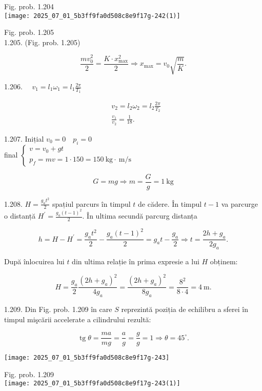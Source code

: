Fig. prob. 1.204\\
\texttt{[image: 2025\_07\_01\_5b3ff9fa0d508c8e9f17g-242(1)]}

Fig. prob. 1.205\\
1.205. (Fig. prob. 1.205)

$$
\frac{m v_{0}^{2}}{2}=\frac{K \cdot x_{\max }^{2}}{2} \Rightarrow x_{\max }=v_{0} \sqrt{\frac{m}{K}} .
$$

1.206. $\quad v_{1}=l_{1} \omega_{1}=l_{1} \frac{2 \pi}{T_{1}}$

$$
\begin{aligned}
& v_{2}=l_{2} \omega_{2}=l_{2} \frac{2 \pi}{T_{2}} \\
& \frac{v_{1}}{v_{2}}=\frac{1}{18} .
\end{aligned}
$$

1.207. Inițial $v_{0}=0 \quad p_{i}=0$\\
final $\left\{\begin{array}{l}v=v_{0}+g t \\ p_{f}=m v=1 \cdot 150=150 \mathrm{~kg} \cdot \mathrm{~m} / \mathrm{s}\end{array}\right.$

$$
G=m g \Rightarrow m=\frac{G}{g}=1 \mathrm{~kg}
$$

1.208. $H=\frac{g_{a} t^{2}}{2}$ spațiul parcurs în timpul $t$ de cădere. În timpul $t-1$ va parcurge o distanță $H^{\prime}=\frac{g_{a}(t-1)^{2}}{2}$. În ultima secundă parcurg distanța

$$
h=H-H^{\prime}=\frac{g_{a} t^{2}}{2}-\frac{g_{a}(t-1)^{2}}{2}=g_{a} t-\frac{g_{a}}{2} \Rightarrow t=\frac{2 h+g_{a}}{2 g_{a}} .
$$

După înlocuirea lui $t$ din ultima relație în prima expresie a lui $H$ obținem:

$$
H=\frac{g_{a}}{2} \frac{\left(2 h+g_{a}\right)^{2}}{4 g_{a}}=\frac{\left(2 h+g_{a}\right)^{2}}{8 g_{a}}=\frac{8^{2}}{8 \cdot 4}=4 \mathrm{~m} .
$$

1.209. Din Fig. prob. 1.209 în care $S$ reprezintă poziția de echilibru a sferei în timpul mişcării accelerate a cilindrului rezultă:

$$
\operatorname{tg} \theta=\frac{m a}{m g}=\frac{a}{g}=\frac{g}{g}=1 \Rightarrow \theta=45^{\circ} .
$$

\begin{center}
\texttt{[image: 2025\_07\_01\_5b3ff9fa0d508c8e9f17g-243]}
\end{center}

Fig. prob. 1.209\\
\texttt{[image: 2025\_07\_01\_5b3ff9fa0d508c8e9f17g-243(1)]}

